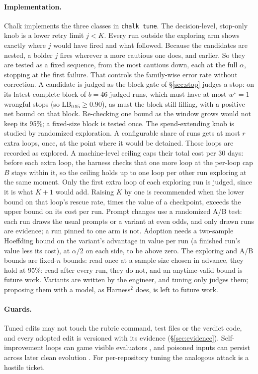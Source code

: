 \documentclass[11pt]{article}
\theoremstyle{remark}
\newcommand{\LB}{\mathrm{LB}}
\begin{document}
\paragraph{Implementation.}
Chalk implements the three classes in \texttt{chalk tune}. The decision-level, stop-only knob is a lower retry limit $j<K$. Every run outside the exploring arm shows exactly where $j$ would have fired and what followed. Because the candidates are nested, a bolder $j$ fires wherever a more cautious one does, and earlier. So they are tested as a fixed sequence, from the most cautious down, each at the full $\alpha$, stopping at the first failure. That controls the family-wise error rate without correction. A candidate is judged as the block gate of \S\ref{sec:stop} judges a stop: on its latest complete block of $b=46$ judged runs, which must have at most $w^\star=1$ wrongful stops (so $\LB_{0.95}\ge 0.90$), as must the block still filling, with a positive net bound on that block. Re-checking one bound as the window grows would not keep its 95\%; a fixed-size block is tested once. The spend-extending knob is studied by randomized exploration. A configurable share of runs gets at most $r$ extra loops, once, at the point where it would be detained. Those loops are recorded as explored. A machine-level ceiling caps their total cost per 30 days: before each extra loop, the harness checks that one more loop at the per-loop cap $B$ stays within it, so the ceiling holds up to one loop per other run exploring at the same moment. Only the first extra loop of each exploring run is judged, since it is what $K{+}1$ would add. Raising $K$ by one is recommended when the lower bound on that loop's rescue rate, times the value of a checkpoint, exceeds the upper bound on its cost per run. Prompt changes use a randomized A/B test: each run draws the usual prompts or a variant at even odds, and only drawn runs are evidence; a run pinned to one arm is not. Adoption needs a two-sample Hoeffding bound on the variant's advantage in value per run (a finished run's value less its cost), at $\alpha/2$ on each side, to be above zero. The exploring and A/B bounds are fixed-$n$ bounds: read once at a sample size chosen in advance, they hold at 95\%; read after every run, they do not, and an anytime-valid bound is future work. Variants are written by the engineer, and tuning only judges them; proposing them with a model, as Harness$^2$ does, is left to future work.

\paragraph{Guards.}
Tuned edits may not touch the rubric command, test files or the verdict code, and every adopted edit is versioned with its evidence (\S\ref{sec:evidence}). Self-improvement loops can game visible evaluators \citep{zhang2025dgm}, and poisoned inputs can persist across later clean evolution \citep{roesner2026trusting}. For per-repository tuning the analogous attack is a hostile ticket.
\end{document}
